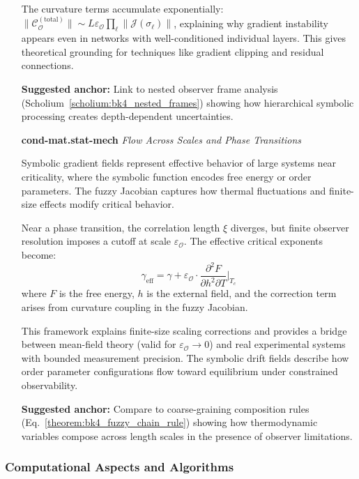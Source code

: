 \begin{itemize}
  The curvature terms accumulate exponentially: $\|\mathcal{C}_{\mathcal{O}}^{(\text{total})}\| \sim L \varepsilon_{\mathcal{O}} \prod_\ell \|\mathcal{J}(\sigma_\ell)\|$, explaining why gradient instability appears even in networks with well-conditioned individual layers. This gives theoretical grounding for techniques like gradient clipping and residual connections.
  
  \textbf{Suggested anchor:} Link to nested observer frame analysis (Scholium~\ref{scholium:bk4_nested_frames}) showing how hierarchical symbolic processing creates depth-dependent uncertainties.

  \item[\textbf{cond-mat.stat-mech}] \textit{Flow Across Scales and Phase Transitions}  
  
  Symbolic gradient fields represent effective behavior of large systems near criticality, where the symbolic function encodes free energy or order parameters. The fuzzy Jacobian captures how thermal fluctuations and finite-size effects modify critical behavior.
  
  Near a phase transition, the correlation length $\xi$ diverges, but finite observer resolution imposes a cutoff at scale $\varepsilon_{\mathcal{O}}$. The effective critical exponents become:
  \[
  \gamma_{\text{eff}} = \gamma + \varepsilon_{\mathcal{O}} \cdot \frac{\partial^2 F}{\partial h^2 \partial T}\bigg|_{T_c}
  \]
  where $F$ is the free energy, $h$ is the external field, and the correction term arises from curvature coupling in the fuzzy Jacobian.
  
  This framework explains finite-size scaling corrections and provides a bridge between mean-field theory (valid for $\varepsilon_{\mathcal{O}} \to 0$) and real experimental systems with bounded measurement precision. The symbolic drift fields describe how order parameter configurations flow toward equilibrium under constrained observability.
  
  \textbf{Suggested anchor:} Compare to coarse-graining composition rules (Eq.~\ref{theorem:bk4_fuzzy_chain_rule}) showing how thermodynamic variables compose across length scales in the presence of observer limitations.

\end{itemize}


\subsubsection{Computational Aspects and Algorithms}

